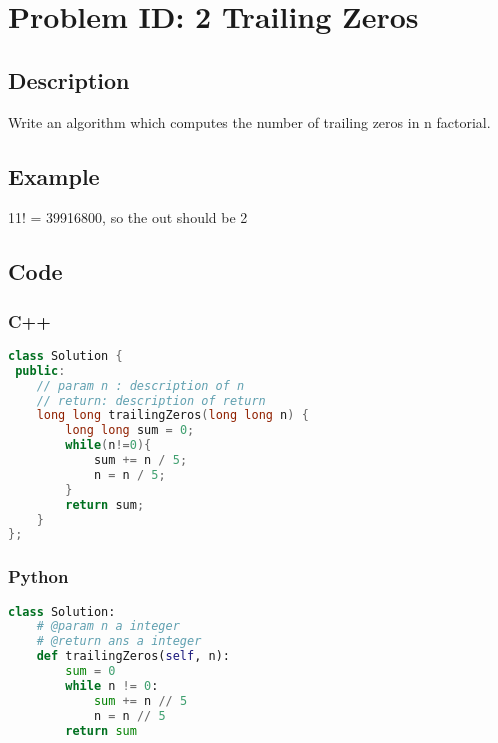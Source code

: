 \section{Problem ID: 2 Trailing Zeros}
\subsection{Description}
Write an algorithm which computes the number of trailing zeros in n factorial.

\subsection{Example}
11! = 39916800, so the out should be 2

\subsection{Code}
\scriptsize
\subsubsection{C++}
\begin{lstlisting}[language=C++]
class Solution {
 public:
    // param n : description of n
    // return: description of return
    long long trailingZeros(long long n) {
        long long sum = 0;
        while(n!=0){
            sum += n / 5;
            n = n / 5;
        }
        return sum;
    }
};
\end{lstlisting}

\subsubsection{Python}
\begin{lstlisting}[language=Python]
class Solution:
    # @param n a integer
    # @return ans a integer
    def trailingZeros(self, n):
        sum = 0
        while n != 0:
            sum += n // 5
            n = n // 5
        return sum
\end{lstlisting}
\normalsize